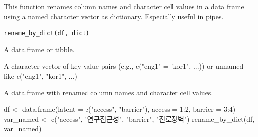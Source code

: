 \documentclass[a4paper]{book}
\begin{document}
%
\begin{Description}
This function renames column names and character cell values in a data frame
using a named character vector as dictionary. Especially useful in pipes.
\end{Description}
%
\begin{Usage}
\begin{verbatim}
rename_by_dict(df, dict)
\end{verbatim}
\end{Usage}
%
\begin{Arguments}
\begin{ldescription}
\item[\code{df}] A data.frame or tibble.

\item[\code{dict}] A character vector of key-value pairs (e.g., c("eng1" = "kor1", ...)) or unnamed like c("eng1", "kor1", ...)
\end{ldescription}
\end{Arguments}
%
\begin{Value}
A data.frame with renamed column names and character cell values.
\end{Value}
%
\begin{Examples}
\begin{ExampleCode}
df <- data.frame(latent = c("access", "barrier"), access = 1:2, barrier = 3:4)
var_named <- c("access", "연구접근성", "barrier", "진로장벽")
rename_by_dict(df, var_named)
\end{ExampleCode}
\end{Examples}
\end{document}
